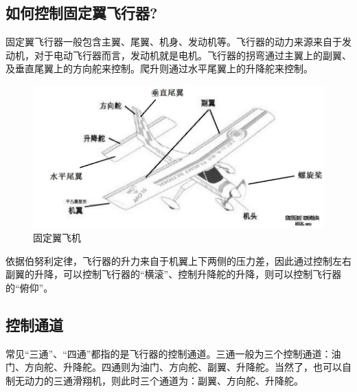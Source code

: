 \documentclass{article}
\begin{document}
\subsection{如何控制固定翼飞行器?}
固定翼飞行器一般包含主翼、尾翼、机身、发动机等。飞行器的动力来源来自于发动机，对于电动飞行器而言，发动机就是电机。飞行器的拐弯通过主翼上的副翼、及垂直尾翼上的方向舵来控制。爬升则通过水平尾翼上的升降舵来控制。

\begin{figure}[ht]
\centering
\includegraphics[scale=0.4]{固定翼.jpg}
\caption{固定翼飞机}
\label{fig:label}
\end{figure}


依据伯努利定律，飞行器的升力来自于机翼上下两侧的压力差，因此通过控制左右副翼的升降，可以控制飞行器的“横滚”、控制升降舵的升降，则可以控制飞行器的“俯仰”。

\subsection{控制通道}
常见“三通”、“四通”都指的是飞行器的控制通道。三通一般为三个控制通道：油门、方向舵、升降舵。四通则为油门、方向舵、副翼、升降舵。当然了，也可以自制无动力的三通滑翔机，则此时三个通道为：副翼、方向舵、升降舵。
\end{document}
